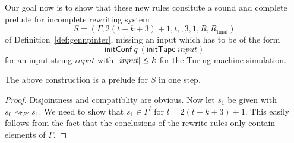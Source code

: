 \documentclass[a4paper,UKenglish,cleveref, autoref]{lipics-v2019}
\newcommand{\strent}{\rightsquigarrow}
\newcommand{\Rfinal}{R_{\text{final}}}
\begin{document}
Our goal now is to show that these new rules consitute a sound and complete prelude for incomplete rewriting system 
\[S = (\Gamma, 2(t + k + 3) + 1, t, , 3, 1, R, \Rfinal)\]
of Definition~\ref{def:gennpinter}, missing an input which has to be of the form 
\[ \textsf{initConf}~q~(\textsf{initTape}~\mathit{input}) \]
for an input string $\mathit{input}$ with $|\mathit{input}| \le k$ for the Turing machine simulation.

\begin{lemma}
  The above construction is a prelude for $S$ in one step. 
\end{lemma}
\begin{proof}
  Disjointness and compatiblity are obvious. 
  Now let $s_1$ be given with $s_0 \strent_{R'} s_1$. We need to show that $s_1 \in \Gamma^l$ for $l = 2 (t + k + 3) + 1$. 
  This easily follows from the fact that the conclusions of the rewrite rules only contain elements of $\Gamma$.
\end{proof}
\end{document}

